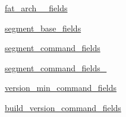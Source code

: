 \begin{DoxyCompactItemize}
\item 
\hyperlink{namespacewheel_1_1macosx__libfile_ad72681123d74f68cdc75e1ffed9ec54e}{fat\+\_\+arch\+\_\+\_\+fields}
\item 
\hyperlink{namespacewheel_1_1macosx__libfile_aff8cc47c4cceddc5c27e13e5b79d65f6}{segment\+\_\+base\+\_\+fields}
\item 
\hyperlink{namespacewheel_1_1macosx__libfile_ac97e2b78cefbb9156bc90e290fd1a5c2}{segment\+\_\+command\+\_\+fields}
\item 
\hyperlink{namespacewheel_1_1macosx__libfile_a2d836c703a4a031289260f4631a08657}{segment\+\_\+command\+\_\+fields\+\_}
\item 
\hyperlink{namespacewheel_1_1macosx__libfile_aead93901cd1e961fb8019dcb923b7033}{version\+\_\+min\+\_\+command\+\_\+fields}
\item 
\hyperlink{namespacewheel_1_1macosx__libfile_a6e2410acf92125b00f2d0f837a3e39fb}{build\+\_\+version\+\_\+command\+\_\+fields}
\end{DoxyCompactItemize}


